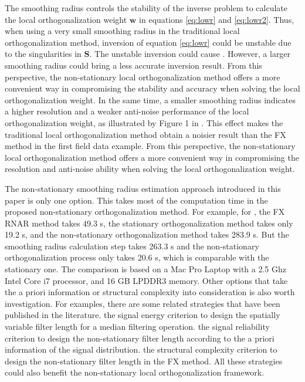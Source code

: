 The smoothing radius controls the stability of the inverse problem to calculate the local orthogonalization weight $\mathbf{w}$ in equations \ref{eq:lowr} and \ref{eq:lowr2}. Thus, when using a very small smoothing radius in the traditional local orthogonalization method, inversion of equation \ref{eq:lowr} could be unstable due to the singularities in $\mathbf{S}$. The unstable inversion could cause . However, a larger smoothing radius could bring a less accurate inversion result. From this perspective, the non-stationary local orthogonalization method offers a more convenient way in compromising the stability and accuracy when solving the local orthogonalization weight. In the same time, a smaller smoothing radius indicates a higher resolution and a weaker anti-noise performance of the local orthogonalization weight, as illustrated by Figure 1 in \cite{yangkang2015ortho}. This effect makes the traditional local orthogonalization method obtain a noisier result than the FX method in the first field data example. From this perspective, the non-stationary local orthogonalization method offers a more convenient way in compromising the resolution and anti-noise ability when solving the local orthogonalization weight. 

The non-stationary smoothing radius estimation approach introduced in this paper is only one option. This  takes most of the computation time in the proposed non-stationary orthogonalization method. For example, for , the FX RNAR method takes 49.3 s, the stationary orthogonalization method takes only 19.2 s, and the non-stationary orthogonalization method takes 283.9 s. But the smoothing radius calculation step takes 263.3 s and the non-stationary orthogonalization process only takes 20.6 s, which is comparable with the stationary one. The comparison is based on a Mac Pro Laptop with a 2.5 Ghz Intel Core i7 processor, and 16 GB LPDDR3 memory.  Other options that take the a priori information or structural complexity into consideration is also worth investigation. For examples, there are some related strategies that have been published in the literature. \cite{liuyang2009tvmf}  the signal energy criterion to design the spatially variable filter length for a median filtering operation. \cite{yangkang2015svmf}  the signal reliability criterion to design the non-stationary filter length according to the a priori information of the signal distribution. \cite{fuchao2020}  the structural complexity criterion to design the non-stationary filter length in the FX method. All these strategies could also benefit the non-stationary local orthogonalization framework.


